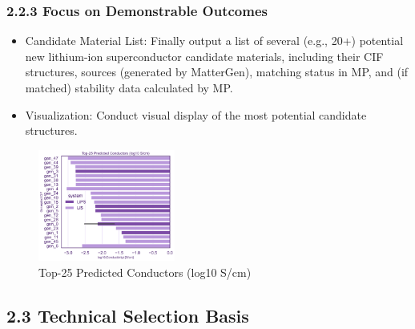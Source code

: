 \documentclass[letterpaper]{article} %
\begin{document}
\subsubsection{2.2.3 Focus on Demonstrable Outcomes}
\begin{itemize}
    \item Candidate Material List: Finally output a list of several (e.g., 20+) potential new lithium-ion superconductor candidate materials, including their CIF structures, sources (generated by MatterGen), matching status in MP, and (if matched) stability data calculated by MP.
    \item Visualization: Conduct visual display of the most potential candidate structures.
\end{itemize}
\begin{figure}[htbp]  %
    \centering  %
    \includegraphics[width=0.4\textwidth]{3.png}  %
    \caption{Top-25 Predicted Conductors (log10 S/cm)}  %
\end{figure}
\subsection{2.3 Technical Selection Basis}

\end{document}
